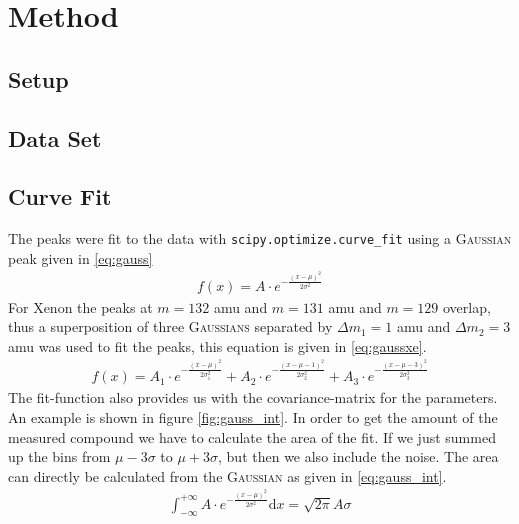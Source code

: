 \newpage
\section{Method} \label{sec:method}
\subsection{Setup}
\subsection{Data Set}

\newpage
\subsection{Curve Fit}
\label{sec:fit}
The peaks were fit to the data with \texttt{scipy.optimize.curve\_fit}\cite{scipy} using a {\scshape Gaussian} peak given in \eqref{eq:gauss}
\begin{align}
    f(x) = A\cdot e^{-\frac{(x-\mu)^2}{2\sigma^2}} \label{eq:gauss}
\end{align}
For Xenon the peaks at $m=132$ amu and $m=131$ amu and $m=129$ overlap, thus a superposition of three {\scshape Gaussians} separated by $\Delta m_1 = 1$ amu and $\Delta m_2 = 3$ amu was used to fit the peaks, this equation is given in \eqref{eq:gaussxe}.
\begin{align}
    f(x) = A_1\cdot e^{-\frac{(x-\mu)^2}{2\sigma_1^2}} + A_2\cdot e^{-\frac{(x-\mu - 1)^2}{2\sigma_2^2}} + A_3\cdot e^{-\frac{(x-\mu-3)^2}{2\sigma_3^2}} \label{eq:gaussxe}
\end{align}
The fit-function also provides us with the covariance-matrix for the parameters.
An example is shown in figure \ref{fig:gauss_int}. In order to get the amount of the measured compound we have to calculate the area of the fit. If we just summed up the bins from $\mu-3\sigma$ to $\mu+3\sigma$, but then we also include the noise. The area can directly be calculated from the {\scshape Gaussian} as given in \eqref{eq:gauss_int}.
\begin{align}
    \int_{-\infty}^{+\infty} A\cdot e^{-\frac{(x-\mu)^2}{2\sigma^2}} \mathrm{d}x = \sqrt{2\pi}A\sigma \label{eq:gauss_int} 
\end{align}
